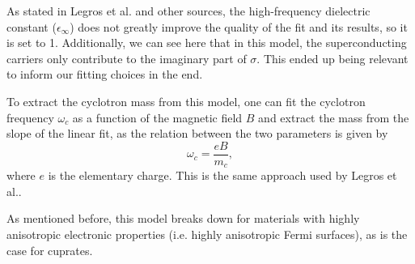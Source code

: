As stated in Legros et al.\cite{legros2022} and other sources, 
the high-frequency dielectric constant ($\epsilon_\infty$) does not greatly improve the quality of the fit and its results, so it is set to 1.
Additionally, we can see here that in this model, the superconducting carriers only contribute to the imaginary part of $\sigma$. 
This ended up being relevant to inform our fitting choices in the end.

To extract the cyclotron mass from this model, one can fit the cyclotron frequency $\omega_c$ as a
function of the magnetic field $B$ and extract the mass from the slope of the linear fit, as the
relation between the two parameters is given by
\begin{equation}
    \omega_c = \frac{eB}{m_c},
\end{equation}
where $e$ is the elementary charge. This is the same approach used by Legros et al.\cite{legros2022}.

As mentioned before, this model breaks down for materials with highly anisotropic electronic properties
(i.e. highly anisotropic Fermi surfaces), as is the case for cuprates.
